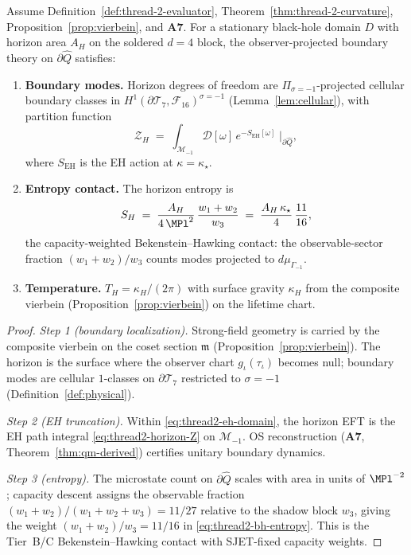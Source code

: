 \begin{theorem}
\label{thm:thread-2-horizon}
Assume Definition~\ref{def:thread-2-evaluator},
Theorem~\ref{thm:thread-2-curvature}, Proposition~\ref{prop:vierbein}, and
\textbf{A7}. For a stationary black-hole domain $D$ with horizon area $A_H$
on the soldered $d=4$ block, the observer-projected boundary theory on
$\partial\hat Q$ satisfies:
\begin{enumerate}[label=(\roman*),leftmargin=*]
  \item \textbf{Boundary modes.}
    Horizon degrees of freedom are $\Pi_{\sigma=-1}$-projected cellular
    boundary classes in $H^1(\partial\mathcal{T}_7,\mathcal{F}_{16})^{\sigma=-1}$
    (Lemma~\ref{lem:cellular}), with partition function
    \begin{equation}\label{eq:thread2-horizon-Z}
      \mathcal{Z}_H
      \;=\;
      \int_{\mathcal{M}_{-1}}
      \mathcal{D}[\omega]\,
      e^{-S_{\mathrm{EH}}[\omega]}
      \;\Big|_{\partial\hat Q},
    \end{equation}
    where $S_{\mathrm{EH}}$ is the EH action at $\kappa=\kappa_\star$.
  \item \textbf{Entropy contact.}
    The horizon entropy is
    \begin{equation}\label{eq:thread2-bh-entropy}
      S_H
      \;=\;
      \frac{A_H}{4\,\MPl^2}\,
      \frac{w_1+w_2}{w_3}
      \;=\;
      \frac{A_H\,\kappa_\star}{4}\,
      \frac{11}{16},
    \end{equation}
    the capacity-weighted Bekenstein--Hawking contact: the observable-sector
    fraction $(w_1+w_2)/w_3$ counts modes projected to
    $d\mu_{\Gamma_{-1}}$.
  \item \textbf{Temperature.}
    $T_H=\kappa_H/(2\pi)$ with surface gravity $\kappa_H$ from the composite
    vierbein (Proposition~\ref{prop:vierbein}) on the lifetime chart.
\end{enumerate}
\end{theorem}

\begin{proof}
\emph{Step 1 (boundary localization).}
Strong-field geometry is carried by the composite vierbein on the coset
section $\mathfrak{m}$ (Proposition~\ref{prop:vierbein}). The horizon is the
surface where the observer chart $g_\iota(\tau_\iota)$ becomes null; boundary
modes are cellular $1$-classes on $\partial\mathcal{T}_7$ restricted to
$\sigma=-1$ (Definition~\ref{def:physical}).

\emph{Step 2 (EH truncation).}
Within \eqref{eq:thread2-eh-domain}, the horizon EFT is the EH path integral
\eqref{eq:thread2-horizon-Z} on $\mathcal{M}_{-1}$. OS reconstruction
(\textbf{A7}, Theorem~\ref{thm:qm-derived}) certifies unitary boundary
dynamics.

\emph{Step 3 (entropy).}
The microstate count on $\partial\hat Q$ scales with area in units of
$\MPl^{-2}$; capacity descent assigns the observable fraction
$(w_1+w_2)/(w_1+w_2+w_3)=11/27$ relative to the shadow block $w_3$, giving
the weight $(w_1+w_2)/w_3=11/16$ in \eqref{eq:thread2-bh-entropy}. This is
the Tier~B/C Bekenstein--Hawking contact with SJET-fixed capacity weights.
\end{proof}


